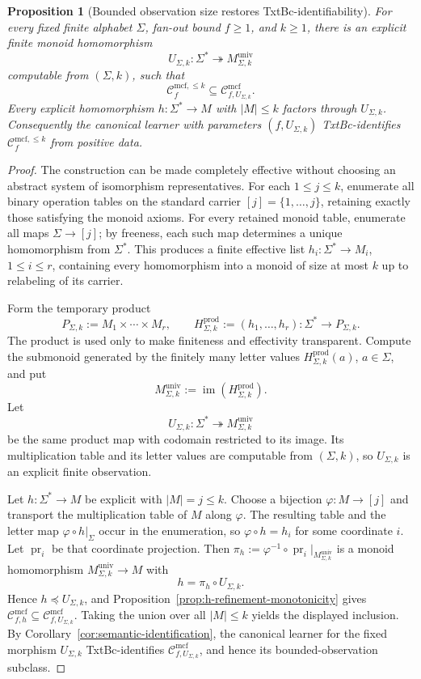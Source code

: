\documentclass[11pt,a4paper]{article}
\numberwithin{equation}{section}
\theoremstyle{plain}
\newtheorem{proposition}[theorem]{Proposition}
\theoremstyle{definition}
\theoremstyle{remark}
\newcommand{\Cmcf}[2]{\mathcal{C}^{\mathrm{mcf}}_{#1,#2}}
\newcommand{\Clatent}[2]{\mathcal{C}^{\mathrm{mcf},\le #2}_{#1}}
\begin{document}
\begin{proposition}[Bounded observation size restores TxtBc-identifiability]
\label{prop:bounded-union-identifiable}
For every fixed finite alphabet \(\Sigma\), fan-out bound \(f\ge1\), and
\(k\ge1\), there is an explicit finite monoid homomorphism
\[
  U_{\Sigma,k}:\Sigma^*\twoheadrightarrow M_{\Sigma,k}^{\mathrm{univ}}
\]
computable from \((\Sigma,k)\), such that
\[
  \Clatent{f}{k}\subseteq\Cmcf{f}{U_{\Sigma,k}}.
\]
Every explicit homomorphism \(h:\Sigma^*\to M\) with \(|M|\le k\) factors
through \(U_{\Sigma,k}\).  Consequently the canonical learner with parameters
\((f,U_{\Sigma,k})\) TxtBc-identifies \(\Clatent{f}{k}\) from positive data.
\end{proposition}

\begin{proof}
The construction can be made completely effective without choosing an
abstract system of isomorphism representatives.  For each
\(1\le j\le k\), enumerate all binary operation tables on the standard carrier
\([j]=\{1,\ldots,j\}\), retaining exactly those satisfying the monoid axioms.
For every retained monoid table, enumerate all maps \(\Sigma\to[j]\); by
freeness, each such map determines a unique homomorphism from \(\Sigma^*\).
This produces a finite effective list
\(h_i:\Sigma^*\to M_i\), \(1\le i\le r\), containing every homomorphism into
a monoid of size at most \(k\) up to relabeling of its carrier.

Form the temporary product
\[
  P_{\Sigma,k}:=M_1\times\cdots\times M_r,
  \qquad
  H^{\mathrm{prod}}_{\Sigma,k}:=(h_1,\ldots,h_r):
     \Sigma^*\to P_{\Sigma,k}.
\]
The product is used only to make finiteness and effectivity transparent.
Compute the submonoid generated by the finitely many letter values
\(H^{\mathrm{prod}}_{\Sigma,k}(a)\), \(a\in\Sigma\), and put
\[
  M_{\Sigma,k}^{\mathrm{univ}}
  :=\operatorname{im}(H^{\mathrm{prod}}_{\Sigma,k}).
\]
Let
\[
  U_{\Sigma,k}:\Sigma^*\twoheadrightarrow M_{\Sigma,k}^{\mathrm{univ}}
\]
be the same product map with codomain restricted to its image.  Its
multiplication table and its letter values are computable from \((\Sigma,k)\),
so \(U_{\Sigma,k}\) is an explicit finite observation.

Let \(h:\Sigma^*\to M\) be explicit with \(|M|=j\le k\).  Choose a
bijection \(\varphi:M\to[j]\) and transport the multiplication table of \(M\)
along \(\varphi\).  The resulting table and the letter map
\(\varphi\circ h|_\Sigma\) occur in the enumeration, so
\(\varphi\circ h=h_i\) for some coordinate \(i\).  Let \(\operatorname{pr}_i\) be that coordinate projection.  Then
\(\pi_h:=\varphi^{-1}\circ\operatorname{pr}_i|_{M_{\Sigma,k}^{\mathrm{univ}}}\)
is a monoid homomorphism \(M_{\Sigma,k}^{\mathrm{univ}}\to M\) with
\[
  h=\pi_h\circ U_{\Sigma,k}.
\]
Hence \(h\preceq U_{\Sigma,k}\), and
Proposition~\ref{prop:h-refinement-monotonicity} gives
\(\Cmcf{f}{h}\subseteq\Cmcf{f}{U_{\Sigma,k}}\).  Taking the union over all
\(|M|\le k\) yields the displayed inclusion.  By
Corollary~\ref{cor:semantic-identification}, the canonical learner for the
fixed morphism \(U_{\Sigma,k}\) TxtBc-identifies
\(\Cmcf{f}{U_{\Sigma,k}}\), and hence its bounded-observation subclass.
\end{proof}
\end{document}
